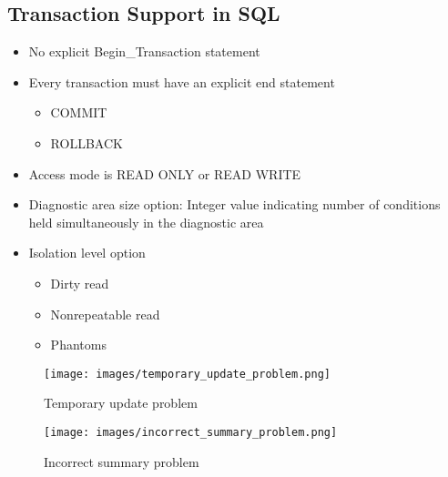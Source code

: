 \documentclass{article}
\begin{document}
\subsection{Transaction Support in SQL}
\begin{itemize}
    \item No explicit Begin\_Transaction statement
    \item Every transaction must have an explicit end statement
    \begin{itemize}
        \item COMMIT
        \item ROLLBACK
    \end{itemize}
    \item Access mode is READ ONLY or READ WRITE
    \item Diagnostic area size option: Integer value indicating number of conditions held 
simultaneously in the diagnostic area
    \item Isolation level option
    \begin{itemize}
        \item Dirty read
        \item Nonrepeatable read
        \item Phantoms
    \end{itemize}
\end{itemize}

\newpage
\begin{appendices}
\begin{figure}[!h]
    \centering
    \texttt{[image: images/temporary\_update\_problem.png]}
    \caption{Temporary update problem}
    \label{fig:temporary_update_problem}
\end{figure}
\begin{figure}[!h]
    \centering
    \texttt{[image: images/incorrect\_summary\_problem.png]}
    \caption{Incorrect summary problem}
    \label{fig:incorrect_summary_problem}
\end{figure}
\end{appendices}
\end{document}
